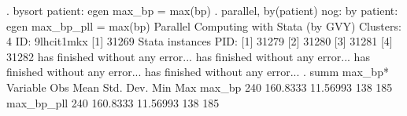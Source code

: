 . bysort patient: egen max_bp = max(bp)
{\smallskip}
. parallel, by(patient) nog: by patient: egen max_bp_pll = max(bp)
Parallel Computing with Stata (by GVY)
Clusters: 4
ID: 9lhcit1mkx
{\smallskip}
[1] 31269
Stata instances PID:
[1] 31279
[2] 31280
[3] 31281
[4] 31282
{} has finished without any error...
{} has finished without any error...
{} has finished without any error...
{} has finished without any error...
{\smallskip}
. summ max_bp*
{\smallskip}
    Variable {\VBAR}       Obs        Mean    Std. Dev.       Min        Max
      max_bp {\VBAR}       240    160.8333    11.56993        138        185
  max_bp_pll {\VBAR}       240    160.8333    11.56993        138        185
{\smallskip}
